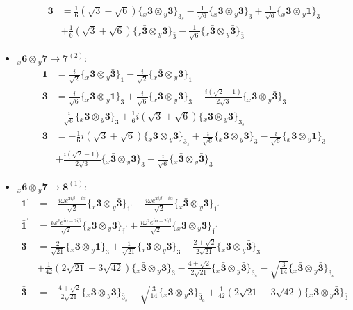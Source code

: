 \documentclass[english]{article}
\newcommand{\rep}[1]{\mathbf{#1}}
\newcommand{\repx}[2]{{}_{#2}\mathbf{#1}}
\newcommand{\tsprodx}[2]{\repx{#1}{x}\otimes\repx{#2}{y}}
\newcommand{\subcgt}[3]{\big\{ \tsprodx{#1}{#2}\big\}^{}_{#3}}
\begin{document}
\begin{itemize}
\begin{align*}
\\
\rep{\bar{3}} & = \frac{1}{6} \left(\sqrt{3}-\sqrt{6}\right)\subcgt{3}{3}{\bar{3}_{s}}-\frac{1}{\sqrt{6}}\subcgt{3}{\bar{3}}{\bar{3}}+\frac{1}{\sqrt{6}}\subcgt{\bar{3}}{1}{\bar{3}} \\ 
 & +\frac{1}{6} \left(\sqrt{3}+\sqrt{6}\right)\subcgt{\bar{3}}{3}{\bar{3}}-\frac{1}{\sqrt{6}}\subcgt{\bar{3}}{\bar{3}}{\bar{3}}
\end{align*}
\item $\tsprodx{6}{7}\to\rep{7}^{(2)}$:
\begin{align*}
\rep{1} & = \frac{i}{\sqrt{2}}\subcgt{3}{\bar{3}}{1}-\frac{i}{\sqrt{2}}\subcgt{\bar{3}}{3}{1}
\\
\rep{3} & = \frac{i}{\sqrt{6}}\subcgt{3}{1}{3}+\frac{i}{\sqrt{6}}\subcgt{3}{3}{3}-\frac{i \left(\sqrt{2}-1\right)}{2 \sqrt{3}}\subcgt{3}{\bar{3}}{3} \\ 
 & -\frac{i}{\sqrt{6}}\subcgt{\bar{3}}{3}{3}+\frac{1}{6} i \left(\sqrt{3}+\sqrt{6}\right)\subcgt{\bar{3}}{\bar{3}}{3_{s}}
\\
\rep{\bar{3}} & = -\frac{1}{6} i \left(\sqrt{3}+\sqrt{6}\right)\subcgt{3}{3}{\bar{3}_{s}}+\frac{i}{\sqrt{6}}\subcgt{3}{\bar{3}}{\bar{3}}-\frac{i}{\sqrt{6}}\subcgt{\bar{3}}{1}{\bar{3}} \\ 
 & +\frac{i \left(\sqrt{2}-1\right)}{2 \sqrt{3}}\subcgt{\bar{3}}{3}{\bar{3}}-\frac{i}{\sqrt{6}}\subcgt{\bar{3}}{\bar{3}}{\bar{3}}
\end{align*}
\item $\tsprodx{6}{7}\to\rep{8}^{(1)}$:
\begin{align*}
\rep{1^{\prime}} & = -\frac{i \omega  e^{2 i \beta -i \alpha }}{\sqrt{2}}\subcgt{3}{\bar{3}}{1^{\prime}}-\frac{i \omega  e^{2 i \beta -i \alpha }}{\sqrt{2}}\subcgt{\bar{3}}{3}{1^{\prime}}
\\
\rep{\bar{1}^{\prime}} & = \frac{i \omega ^2 e^{i \alpha -2 i \beta }}{\sqrt{2}}\subcgt{3}{\bar{3}}{\bar{1}^{\prime}}+\frac{i \omega ^2 e^{i \alpha -2 i \beta }}{\sqrt{2}}\subcgt{\bar{3}}{3}{\bar{1}^{\prime}}
\\
\rep{3} & = \frac{2}{\sqrt{21}}\subcgt{3}{1}{3}+\frac{1}{\sqrt{21}}\subcgt{3}{3}{3}-\frac{2+\sqrt{2}}{2 \sqrt{21}}\subcgt{3}{\bar{3}}{3} \\ 
 & +\frac{1}{42} \left(2 \sqrt{21}-3 \sqrt{42}\right)\subcgt{\bar{3}}{3}{3}-\frac{4+\sqrt{2}}{2 \sqrt{21}}\subcgt{\bar{3}}{\bar{3}}{3_{s}}-\sqrt{\frac{3}{14}}\subcgt{\bar{3}}{\bar{3}}{3_{a}}
\\
\rep{\bar{3}} & = -\frac{4+\sqrt{2}}{2 \sqrt{21}}\subcgt{3}{3}{\bar{3}_{s}}-\sqrt{\frac{3}{14}}\subcgt{3}{3}{\bar{3}_{a}}+\frac{1}{42} \left(2 \sqrt{21}-3 \sqrt{42}\right)\subcgt{3}{\bar{3}}{\bar{3}} \\ 

\end{align*}
\end{itemize}
\end{document}
